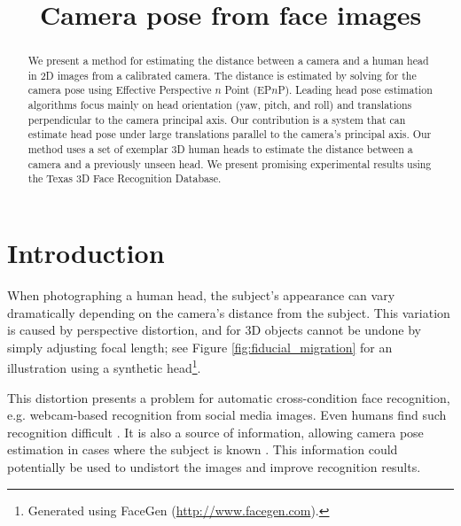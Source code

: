 \documentclass[runningheads]{llncs}
\begin{document}
\pagestyle{headings}

\mainmatter

\title{Camera pose from face images}


\maketitle

\begin{abstract}
We present a method for estimating the distance between a camera and a human head in 2D images from a calibrated camera.  The distance is estimated by solving for the camera pose using Effective Perspective $n$ Point (EP$n$P).  Leading head pose estimation algorithms focus mainly on head orientation (yaw, pitch, and roll) and translations perpendicular to the camera principal axis.  Our contribution is a system that can estimate head pose under large translations parallel to the camera's principal axis.  Our method uses a set of exemplar 3D human heads to estimate the distance between a camera and a previously unseen head.  We present promising experimental results using the Texas 3D Face Recognition Database.
\end{abstract}

\section{Introduction}
When photographing a human head, the subject's appearance can vary dramatically depending on the camera's distance from the subject.
This variation is caused by perspective distortion, and for 3D objects cannot be undone by simply adjusting focal length; see Figure \ref{fig:fiducial_migration} for an illustration using a synthetic head\footnote{Generated using FaceGen (\url{http://www.facegen.com}).}.

This distortion presents a problem for automatic cross-condition face recognition, e.g. webcam-based recognition from social media images.
Even humans find such recognition difficult \cite{liu2003face,liu2006face}.
It is also a source of information, allowing camera pose estimation in cases where the subject is known \cite{ohayon2006robust}.
This information could potentially be used to undistort the images and improve recognition results.
\end{document}
